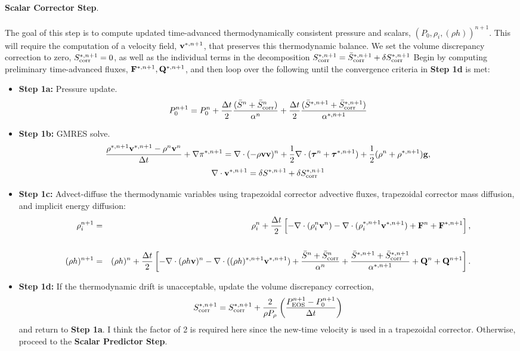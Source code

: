 \documentclass[final]{siamltex}
\def\Fb {{\bf F}}
\def\gb {{\bf g}}
\def\Qb {{\bf Q}}
\def\vb {{\bf v}}
\def\taub   {\boldsymbol{\tau}}
\begin{document}
{\bf Scalar Corrector Step}.\\ \\
The goal of this step is to compute updated time-advanced thermodynamically consistent 
pressure and scalars, $(P_0,\rho_i,(\rho h))^{n+1}$.  This will require the computation
of a velocity field, $\vb^{*,n+1}$, that preserves this thermodynamic balance.
We set the volume discrepancy correction to zero,
$S_{\rm corr}^{*,n+1} = 0$, as well as the individual terms in the decomposition
$S_{\rm corr}^{*,n+1} = \bar{S}_{\rm corr}^{*,n+1} + \delta S_{\rm corr}^{*,n+1}$
Begin by computing preliminary time-advanced fluxes, $\Fb^{*,n+1}, \Qb^{*,n+1}$,
and then loop over the following until the convergence criteria in {\bf Step 1d} is met:\\
\begin{itemize}
\item {\bf Step 1a:} Pressure update.
\begin{equation}
P_0^{n+1} = P_0^n + \frac{\Delta t}{2}\frac{(\bar{S}^n + \bar{S}_{\rm corr}^n)}{\alpha^n} + \frac{\Delta t}{2}\frac{(\bar{S}^{*,n+1} + \bar{S}_{\rm corr}^{*,n+1})}{\alpha^{*,n+1}}
\end{equation}
\item {\bf Step 1b:} GMRES solve.
\begin{equation}
\frac{\rho^{*,n+1}\vb^{*,n+1} - \rho^n\vb^n}{\Delta t} + \nabla\pi^{*,n+1} = \nabla\cdot(-\rho\vb\vb)^n + \frac{1}{2}\nabla\cdot(\taub^n + \taub^{*,n+1}) + \frac{1}{2}(\rho^n + \rho^{*,n+1})\gb,
\end{equation}
\begin{equation}
\nabla\cdot\vb^{*,n+1} = \delta S^{*,n+1} + \delta S_{\rm corr}^{*,n+1}
\end{equation}
\item {\bf Step 1c:} Advect-diffuse the thermodynamic variables using trapezoidal corrector advective fluxes,
trapezoidal corrector mass diffusion, and implicit energy diffusion:
\begin{eqnarray}
\rho_i^{n+1} &=& \rho_i^n + \frac{\Delta t}{2}\left[-\nabla\cdot(\rho_i^n\vb^n) -\nabla\cdot(\rho_i^{*,n+1}\vb^{*,n+1}) + \Fb^n + \Fb^{*,n+1}\right],\nonumber \\
\\
(\rho h)^{n+1} &=& (\rho h)^n + \frac{\Delta t}{2}\left[-\nabla\cdot(\rho h\vb)^n -\nabla\cdot((\rho h)^{*,n+1}\vb^{*,n+1}) + \frac{\bar{S}^n + \bar{S}_{\rm corr}^n}{\alpha^n} + \frac{\bar{S}^{*,n+1}+ \bar{S}_{\rm corr}^{*,n+1}}{\alpha^{*,n+1}} + \Qb^n + \Qb^{n+1}\right].\nonumber\\
\end{eqnarray}
\item {\bf Step 1d:} If the thermodynamic drift is unacceptable, update the volume 
discrepancy correction,
\begin{equation}
S_{\rm corr}^{*,n+1} = S_{\rm corr}^{*,n+1} + \frac{2}{\rho P_\rho}\left(\frac{P_{\rm EOS}^{n+1} - P_0^{n+1}}{\Delta t}\right)
\end{equation}
and return to {\bf Step 1a}.  I think the factor of 2 is required here since the new-time
velocity is used in a trapezoidal corrector.  Otherwise, 
proceed to the {\bf Scalar Predictor Step}.\\
\end{itemize}
\end{document}
